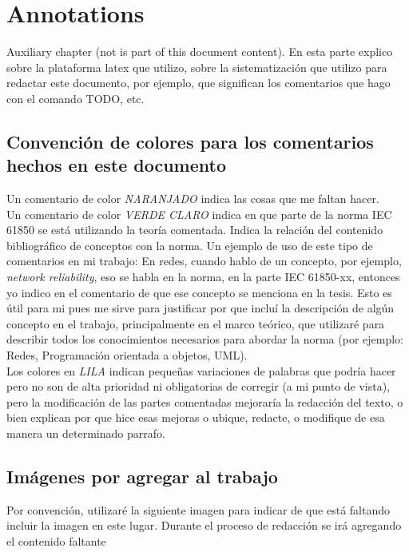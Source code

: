 \chapter*{Annotations}

Auxiliary chapter (not is part of this document content).
En esta parte explico sobre la plataforma latex que utilizo, sobre la
sistematizaci\'on que utilizo para redactar este documento, por ejemplo, que
significan los comentarios que hago con el comando TODO, etc.

\section{Convenci\'on de colores para los comentarios hechos en este documento}
	Un comentario de color 
	\emph{NARANJADO}
	indica las cosas que me faltan hacer.\\

	Un comentario de color 
	\emph{VERDE CLARO}
	indica en que parte de la norma IEC 61850 se est\'a utilizando la teor\'ia
	comentada. Indica la relaci\'on del contenido bibliogr\'afico de conceptos con
	la norma. 
	Un ejemplo de uso de este tipo de comentarios en mi trabajo:
	En redes, cuando hablo de un concepto, por ejemplo, \emph{network
	reliability}, eso se habla en la norma, en la parte IEC 61850-xx, entonces yo
	indico en el comentario de que ese concepto se menciona en la tesis. 
	Esto es \'util para mi pues me sirve para justificar por que inclu\'i la 
	descripci\'on de alg\'un concepto en el trabajo, principalmente en el marco
	te\'orico, que utilizar\'e para describir todos los conocimientos necesarios
	para abordar la norma (por ejemplo: Redes, Programaci\'on orientada a
	objetos, UML).\\
	
	Los colores en \emph{LILA}
	indican peque\~nas variaciones de palabras que podr\'ia hacer pero no son de
	alta prioridad ni obligatorias de corregir (a mi punto de vista), pero
	la modificaci\'on de las partes comentadas mejorar\'ia la redacci\'on del
	texto, o bien explican por que hice esas mejoras o ubique, redacte, 
	o modifique de esa 	manera un determinado parrafo.
	

\section{Im\'agenes por agregar al trabajo}
	Por convenci\'on, utilizar\'e la siguiente imagen
	para indicar de que est\'a faltando incluir la imagen en este lugar. Durante
	el proceso de redacci\'on se ir\'a agregando el contenido faltante




\listoftodos

